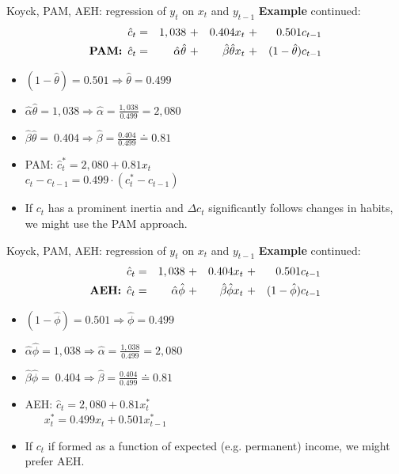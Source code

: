 \documentclass{beamer}
\begin{document}
\begin{frame}{Koyck, PAM, AEH: regression of $y_t$ on $x_t$ and $y_{t-1}$}
\textbf{Example} continued:
\begin{equation*}
\begin{aligned}
\hat{c}_t & = &1,038~&+ &0.404 x_t~ &+ &0.501 c_{t-1} \\
\textnormal{\textbf{PAM:}} \,\,\, \hat{c}_t& = &\hat{\alpha} \hat{\theta}~&+ &\hat{\beta} \hat{\theta} x_t~&+ &(1-\hat{\theta}) c_{t-1} 
\end{aligned}
\end{equation*}

\begin{itemize}
\item $(1-\hat{\theta})=0.501 \Rightarrow \hat{\theta} = 0.499$
\smallskip
\item $\hat{\alpha} \hat{\theta} = 1,038 \Rightarrow \hat{\alpha}= \frac{1,038}{0.499}=2,080$
\item $\hat{\beta} \hat{\theta} = ~ 0.404 \Rightarrow \hat{\beta}= \frac{0.404}{0.499} \doteq 0.81$
\bigskip
\item PAM: $\hat{c}_t^{\ast} = 2,080 + 0.81 x_t$\\
\smallskip
$c_t - c_{t-1} = 0.499 \cdot (c_t^{\ast}-c_{t-1})$
\bigskip
\item If $c_t$ has a prominent inertia and $\Delta c_t$ significantly follows changes in habits, we might use the PAM approach.
\end{itemize}
\end{frame}


\begin{frame}{Koyck, PAM, AEH: regression of $y_t$ on $x_t$ and $y_{t-1}$}
\textbf{Example} continued:
\begin{equation*}
\begin{aligned}
\hat{c}_t & = &1,038~&+ &0.404 x_t~ &+ &0.501 c_{t-1} \\
\textnormal{\textbf{AEH:}} \,\,\, \hat{c}_t& = &\hat{\alpha} \hat{\phi}~&+ &\hat{\beta} \hat{\phi} x_t~&+ &(1-\hat{\phi}) c_{t-1} 
\end{aligned}
\end{equation*}

\begin{itemize}
\item $(1-\hat{\phi})=0.501 \Rightarrow \hat{\phi} = 0.499$
\smallskip
\item $\hat{\alpha} \hat{\phi} = 1,038 \Rightarrow \hat{\alpha}= \frac{1,038}{0.499}=2,080$
\item $\hat{\beta} \hat{\phi} = ~ 0.404 \Rightarrow \hat{\beta}= \frac{0.404}{0.499} \doteq 0.81$
\bigskip
\item AEH: $\hat{c}_t = 2,080 + 0.81 x_t^{\ast}$\\
\smallskip
$~~~~~~~\,x_t^{\ast} = 0.499 x_t + 0.501 x_{t-1}^{\ast}$
\bigskip
\item If $c_t$ if formed as a function of expected (e.g. permanent) income, we might prefer AEH.
\end{itemize}
\end{frame}
\end{document}
